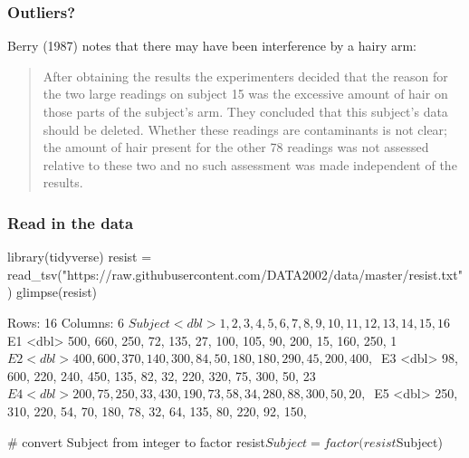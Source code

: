 \documentclass[a4paper]{article}\usepackage[]{graphicx}\usepackage[]{xcolor}
\begin{document}
\subsubsection{Outliers?}
Berry (1987) notes that there may have been interference by a hairy arm:
\begin{tcolorbox}[bluestyleline]
	\blockquote{After obtaining the results the experimenters decided that the reason for the two large readings on subject 15 was the excessive amount of hair on those parts of the subject's arm. They concluded that this subject's data should be deleted. Whether these readings are contaminants is not clear; the amount of hair present for the other 78 readings was not assessed relative to these two and no such assessment was made independent of the results.}
\end{tcolorbox}
\subsubsection{Read in the data}
\begin{Schunk}
\begin{Sinput}
library(tidyverse)
resist = read_tsv("https://raw.githubusercontent.com/DATA2002/data/master/resist.txt")
glimpse(resist)
\end{Sinput}
\begin{Soutput}
Rows: 16
Columns: 6
$ Subject <dbl> 1, 2, 3, 4, 5, 6, 7, 8, 9, 10, 11, 12, 13, 14, 15, 16
$ E1      <dbl> 500, 660, 250, 72, 135, 27, 100, 105, 90, 200, 15, 160, 250, 1~
$ E2      <dbl> 400, 600, 370, 140, 300, 84, 50, 180, 180, 290, 45, 200, 400, ~
$ E3      <dbl> 98, 600, 220, 240, 450, 135, 82, 32, 220, 320, 75, 300, 50, 23~
$ E4      <dbl> 200, 75, 250, 33, 430, 190, 73, 58, 34, 280, 88, 300, 50, 20, ~
$ E5      <dbl> 250, 310, 220, 54, 70, 180, 78, 32, 64, 135, 80, 220, 92, 150,~
\end{Soutput}
\begin{Sinput}
# convert Subject from integer to factor
resist$Subject = factor(resist$Subject) 
\end{Sinput}
\end{Schunk}
\end{document}
